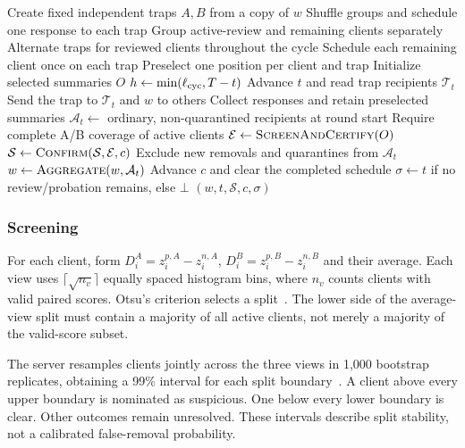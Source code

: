 \documentclass[conference]{IEEEtran}
\begin{document}
\begin{algorithm}[!htb]
\caption{Phase II: collect and assess paired responses}\label{alg:paired}
\begin{algorithmic}[1]\small
{}
 \State Create fixed independent traps $A,B$ from a copy of $w$
  \State Shuffle groups and schedule one response to each trap
 \Else
  \State Group active-review and remaining clients separately
  \State Alternate traps for reviewed clients throughout the cycle
  \State Schedule each remaining client once on each trap
 \EndIf
 \State Preselect one position per client and trap\label{ln:paired:select}
 \State Initialize selected summaries $O$
 \State $h\gets\min(\ell_{\rm cyc},T-t)$
  \State Advance $t$ and read trap recipients $\mathcal T_t$
  \State Send the trap to $\mathcal T_t$ and $w$ to others
  \State Collect responses and retain preselected summaries
  \State $\mathcal A_t\gets$ ordinary, non-quarantined recipients at round start
   \State Require complete A/B coverage of active clients
   \State $\mathcal E\gets\Call{ScreenAndCertify}{O}$\label{ln:paired:screen}
   \State $\mathcal S\gets\Call{Confirm}{\mathcal S,\mathcal E,c}$\label{ln:paired:confirm}
   \State Exclude new removals and quarantines from $\mathcal A_t$\label{ln:paired:filter}
  \EndIf
  \State $w\gets\Call{Aggregate}{w,\mathcal A_t}$
 \EndFor
  \State Advance $c$ and clear the completed schedule
  \State $\sigma\gets t$ if no review/probation remains, else $\bot$
 \EndIf
 \State \Return $(w,t,\mathcal S,c,\sigma)$
\EndProcedure
\end{algorithmic}
\end{algorithm}

\subsubsection{Screening}
For each client, form $D_i^A=z_i^{p,A}-z_i^{n,A}$,
$D_i^B=z_i^{p,B}-z_i^{n,B}$ and their average. Each view uses
$\lceil\sqrt{n_v}\rceil$ equally spaced histogram bins, where $n_v$ counts
clients with valid paired scores. Otsu's criterion selects a
split~\cite{otsu1979threshold}. The lower side of the average-view split
must contain a majority of all active clients, not merely a majority of
the valid-score subset.

The server resamples clients jointly across the three views in 1,000
bootstrap replicates, obtaining a 99\% interval for each split
boundary~\cite{efron1979bootstrap}. A client above every upper boundary
is nominated as suspicious. One below every lower boundary is clear.
Other outcomes remain unresolved. These intervals describe split
stability, not a calibrated false-removal probability.
\end{document}

